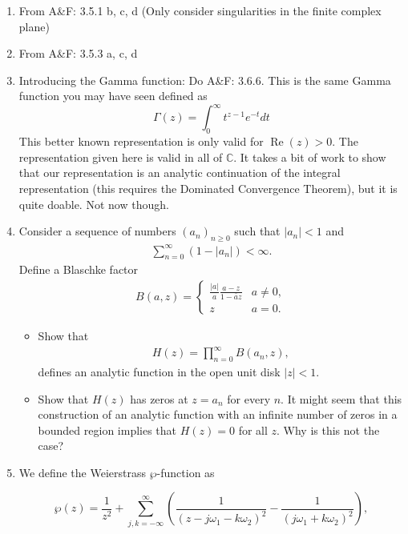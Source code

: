 \documentclass[10pt]{amsart}
\theoremstyle{nonumberplain}
\begin{document}
\mline
\begin{enumerate}[label={\bf {\arabic*}:}]
\item  From A\&F: 3.5.1 b, c, d (Only consider singularities in the finite
  complex plane)\\
\item From A\&F: 3.5.3 a, c, d\\
\item Introducing the Gamma function: Do A\&F: 3.6.6. This is the same Gamma function you may have seen defined as
$$
\Gamma(z)=\int_0^{\infty} t^{z-1} e^{-t} d t
$$
This better known representation is only valid for
$\operatorname{Re}(z)>0$. The representation given here is valid in
all of $\mathbb{C}$. It takes a bit of work to show that our
representation is an analytic continuation of the integral
representation (this requires the Dominated Convergence Theorem), but
it is quite doable. Not now though.\\
\item Consider a sequence of numbers $(a_n)_{n \geq 0}$ such that
  $|a_n| < 1$ and
  \begin{align*}
    \sum_{n = 0}^\infty (1 - |a_n|) < \infty.
  \end{align*}
  Define a Blaschke  factor
  \begin{align*}
    B(a,z) = \begin{cases} \frac{|a|}{a} \frac{ a - z}{ 1 - \bar a z}
      & a \neq 0,\\
      z & a  =0.\end{cases}
  \end{align*}
  \begin{itemize}
  \item Show that
  \begin{align*}
    H(z) = \prod_{n=0}^\infty B(a_n,z),
  \end{align*}
  defines an analytic function in the open unit disk $|z| < 1$.
  \item Show that $H(z)$ has zeros at $z = a_n$ for every $n$.  It
    might seem that this construction of an analytic function with an
    infinite number of zeros in a bounded region implies that $H(z) =
    0$ for all $z$.  Why is this not the case?\\
  \end{itemize}

  \item We define the Weierstrass $\wp$-function as

$$
\wp(z)=\frac{1}{z^2}+\sum_{j, k=-\infty}^{\infty}\left(\frac{1}{\left(z-j \omega_1-k \omega_2\right)^2}-\frac{1}{\left(j \omega_1+k \omega_2\right)^2}\right),
$$


\end{enumerate}
\end{document}
